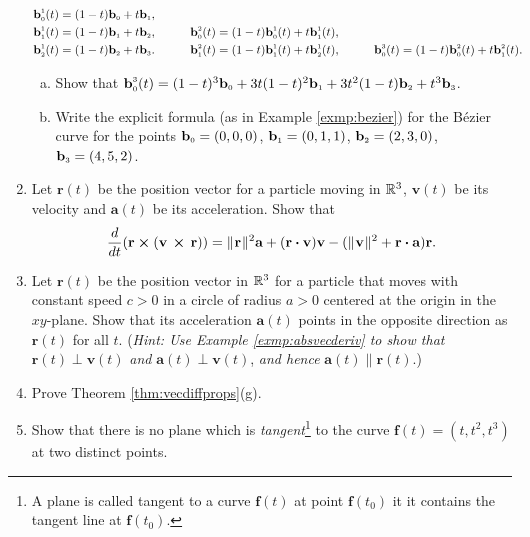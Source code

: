 \begin{enumerate}[\bfseries 1.]
  \begin{alignat*}{3}
   \textbf{b}_{\scriptscriptstyle 0}^{\scriptscriptstyle 1}(t) &= ( 1 - t )\textbf{b}_{\scriptscriptstyle 0} + t \textbf{b}_{\scriptscriptstyle 1},
    \\
   \textbf{b}_{\scriptscriptstyle 1}^{\scriptscriptstyle 1}(t) &= ( 1 - t )\textbf{b}_{\scriptscriptstyle 1} + t \textbf{b}_{\scriptscriptstyle 2}, \qquad
    & \textbf{b}_{\scriptscriptstyle 0}^{\scriptscriptstyle 2}(t) &=
    ( 1 - t )\textbf{b}_{\scriptscriptstyle 0}^{\scriptscriptstyle 1}(t) + t \textbf{b}_{\scriptscriptstyle 1}^{\scriptscriptstyle 1}(t),
    \\
   \textbf{b}_{\scriptscriptstyle 2}^{\scriptscriptstyle 1}(t) &= ( 1 - t )\textbf{b}_{\scriptscriptstyle 2} + t \textbf{b}_{\scriptscriptstyle 3}.\qquad
    & \textbf{b}_{\scriptscriptstyle 1}^{\scriptscriptstyle 2}(t) &=
    ( 1 - t )\textbf{b}_{\scriptscriptstyle 1}^{\scriptscriptstyle 1}(t) + t \textbf{b}_{\scriptscriptstyle 2}^{\scriptscriptstyle 1}(t),\qquad
    & \textbf{b}_{\scriptscriptstyle 0}^{\scriptscriptstyle 3}(t) &=
    ( 1 - t )\textbf{b}_{\scriptscriptstyle 0}^{\scriptscriptstyle 2}(t) + t \textbf{b}_{\scriptscriptstyle 1}^{\scriptscriptstyle 2}(t).
  \end{alignat*}
  \begin{enumerate}[(a)]
   \item Show that $\textbf{b}_{\scriptscriptstyle 0}^{\scriptscriptstyle 3}(t) = (1 - t)^3 \textbf{b}_{\scriptscriptstyle 0} +
    3t(1 - t)^2 \textbf{b}_{\scriptscriptstyle 1} + 3t^2 (1 - t) \textbf{b}_{\scriptscriptstyle 2} + t^3 \textbf{b}_{\scriptscriptstyle 3}$.
   \item Write the explicit formula (as in Example \ref{exmp:bezier}) for the B\'{e}zier curve for the points
   $\textbf{b}_{\scriptscriptstyle 0} = (0,0,0)$, $\textbf{b}_{\scriptscriptstyle 1} = (0,1,1)$, $\textbf{b}_{\scriptscriptstyle 2} = (2,3,0)$,
   $\textbf{b}_{\scriptscriptstyle 3} = (4,5,2)$.
  \end{enumerate}
\item 
Let $\textbf{r}(t)$ be the position vector for a particle moving in $\mathbb{R}^{3}$,
$\textbf{v}(t)$ be its velocity 
and $\textbf{a}(t)$ be its acceleration.
Show that
  \begin{displaymath}
   \dfrac{d}{dt} ( \textbf{r} \bm{\times} ( \textbf{v}\, \bm{\times} \,\textbf{r} ) ) =
    \lVert\mspace{1mu}\textbf{r}\mspace{1mu}\rVert^2 \textbf{a} + (\textbf{r} \bm{\cdot} \textbf{v}) \textbf{v} -
    (\lVert\mspace{1mu}\textbf{v}\mspace{1mu}\rVert^2 + \textbf{r} \bm{\cdot} \textbf{a})\textbf{r}.
  \end{displaymath} 
\item 
Let $\textbf{r}(t)$ be the position vector in $\mathbb{R}^{3}$ for a particle that moves with constant speed $c > 0$ in a circle of radius $a > 0$ centered at the origin in the $xy$-plane. 
Show that its acceleration $\textbf{a}(t)$ points in the opposite direction as
  $\textbf{r}(t)$ for all $t$. (\emph{Hint: Use Example \ref{exmp:absvecderiv} to show that} $\textbf{r}(t)
  \perp \textbf{v}(t)$ \emph{and} $\textbf{a}(t) \perp \textbf{v}(t)$, \emph{and hence} $\textbf{a}(t) \parallel
  \textbf{r}(t)$.)
 \item Prove Theorem \ref{thm:vecdiffprops}(g).
 
 \item Show that there is no plane which is \emph{tangent}\footnote{A plane is called tangent to a curve $\textbf{f}(t)$ at point $\textbf{f}(t_0)$ it it contains the tangent line at $\textbf{f}(t_0)$.} to the curve $\textbf{f}(t)=(t,t^2,t^3)$ at two distinct points.
\end{enumerate}
